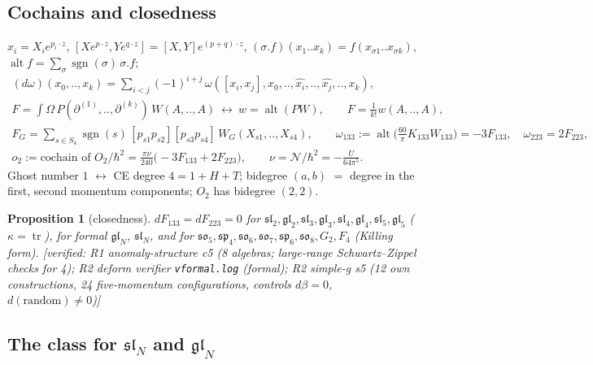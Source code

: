 \documentclass[10pt,a4paper]{article}
\numberwithin{equation}{section}
\newtheorem{proposition}[theorem]{Proposition}
\theoremstyle{definition}
\theoremstyle{remark}
\newcommand{\tr}{\operatorname{tr}}
\newcommand{\alt}{\operatorname{alt}}
\newcommand{\sgn}{\operatorname{sgn}}
\newcommand{\fsl}{\mathfrak{sl}}
\newcommand{\fgl}{\mathfrak{gl}}
\newcommand{\fso}{\mathfrak{so}}
\newcommand{\fsp}{\mathfrak{sp}}
\newcommand{\cN}{\mathcal N}
\newcommand{\ver}[1]{\textup{[verified: #1]}}
\begin{document}
\subsection{Cochains and closedness}\label{sec-cochains}

$x_i=X_ie^{p_i\cdot z}$, $[Xe^{p\cdot z},Ye^{q\cdot z}]=[X,Y]e^{(p+q)\cdot z}$, $(\sigma.f)(x_1..x_k)=f(x_{\sigma1}..x_{\sigma k})$, $\alt f=\sum_\sigma\sgn(\sigma)\,\sigma.f$;
\begin{gather}
(d\omega)(x_0,..,x_k)=\sum_{i<j}(-1)^{i+j}\,\omega([x_i,x_j],x_0,..,\widehat{x_i},..,\widehat{x_j},..,x_k),\\
F=\int\Omega\,P(\partial^{(1)},..,\partial^{(k)})\,W(A,..,A)\ \longleftrightarrow\ w=\alt(PW),\qquad F=\tfrac1{k!}w(A,..,A),\\
F_G=\sum_{s\in S_4}\sgn(s)\,[p_{s1}p_{s2}][p_{s3}p_{s4}]\,W_G(X_{s1},..,X_{s4}),\qquad \omega_{133}:=\alt\big(\tfrac{60}\pi K_{133}W_{133}\big)=-3F_{133},\quad \omega_{223}=2F_{223},\\
o_2:=\text{cochain of }O_2/\hbar^2=\frac{\pi\nu}{240}\big(-3F_{133}+2F_{223}\big),\qquad \nu=\cN/\hbar^2=-\frac{U}{64\pi^5}.
\end{gather}
Ghost number $1$ $\leftrightarrow$ CE degree $4=1+H+T$; bidegree $(a,b)$ $=$ degree in the first, second momentum components; $O_2$ has bidegree $(2,2)$.

\begin{proposition}[closedness]\label{prop-closed}
$dF_{133}=dF_{223}=0$ for $\fsl_2,\fgl_2,\fsl_3,\fgl_3,\fsl_4,\fgl_4,\fsl_5,\fgl_5$ ($\kappa=\tr$), for formal $\fgl_N$, $\fsl_N$, and for $\fso_5,\fsp_4,\fso_6,\fso_7,\fsp_6,\fso_8,G_2,F_4$ (Killing form).
\ver{R1 anomaly-structure c5 (8 algebras; large-range Schwartz--Zippel checks for 4); R2 deform verifier \texttt{vformal.log} (formal); R2 simple-g s5 (12 own constructions, 24 five-momentum configurations, controls $d\beta=0$, $d(\text{random})\ne0$)}
\end{proposition}

\subsection{\texorpdfstring{The class for $\fsl_N$ and $\fgl_N$}{The class for sl(N) and gl(N)}}\label{sec-class-slN}
\end{document}
